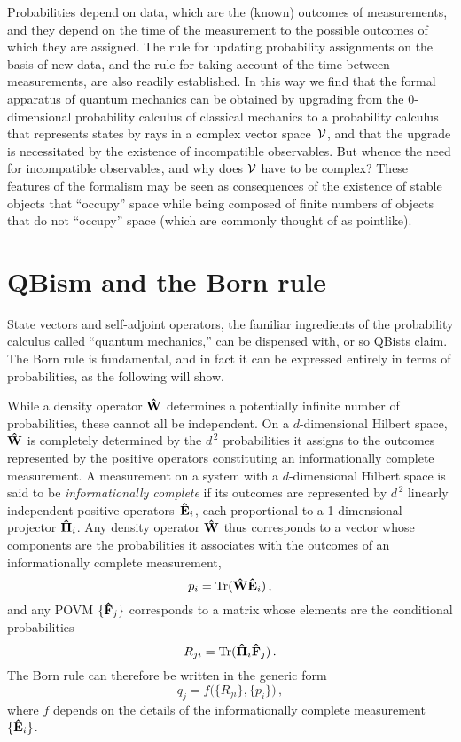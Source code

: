 \documentclass[smallextended]{svjour3}
\newcommand{\be}{\begin{equation}}
\newcommand{\ee}{\end{equation}}
\newcommand{\hE}{{\bf\hat E}}
\newcommand{\hF}{{\bf\hat F}}
\newcommand{\hW}{{\bf\hat W}}
\newcommand{\hPi}{{\bf\hat\Pi}}
\newcommand{\cV}{{\cal V}}
\begin{document}
Probabilities depend on data, which are the (known) outcomes of measurements, and they depend on the time of the measurement to the possible outcomes of which they are assigned. The rule for updating probability assignments on the basis of new data, and the rule for taking account of the time between measurements, are also readily established.\cite{Mohrhoff-QMexplained} In this way we find that the formal apparatus of quantum mechanics can be obtained by upgrading from the 0-dimensional probability calculus of classical mechanics to a probability calculus that represents states by rays in a complex vector space~$\cV$, and that the upgrade is necessitated by the existence of incompatible observables. But whence the need for incompatible observables, and why does $\cV$ have to be complex? These features of the formalism may be seen as consequences of the existence of stable objects that ``occupy'' space while being composed of finite numbers of objects that do not ``occupy'' space (which are commonly thought of as pointlike).\cite{Mohrhoff_Manifesting,Mohrhoff-QMexplained}


\section{QBism and the Born rule}\label{sec.QBBorn}
State vectors and self-adjoint operators, the familiar ingredients of the probability calculus called ``quantum mechanics,'' can be dispensed with, or so QBists claim. The Born rule is fundamental, and in fact it can be expressed entirely in terms of probabilities, as the following will show. 

While a density operator $\hW$ determines a potentially infinite number of probabilities, these cannot all be independent. On a $d$-dimensional Hilbert space, $\hW$ is completely determined by the $d^{\,2}$ probabilities it assigns to the outcomes represented by the positive operators constituting an informationally complete measurement. A measurement on a system with a $d$-dimensional Hilbert space is said to be \emph{informationally complete} if its outcomes are represented by $d^{\,2}$ linearly independent positive operators~$\hE_i$, each proportional to a 1-dimensional projector $\hPi_i$. Any density operator $\hW$ thus corresponds to a vector whose components are the probabilities it associates with the outcomes of an informationally complete measurement, 
\be
p_i=\hbox{Tr}(\hW\hE_i)\,,
\ee
and any POVM $\{\hF_j\}$ corresponds to a matrix whose elements are the conditional probabilities
\be
R_{ji}=\hbox{Tr}(\hPi_i\hF_j)\,.
\ee
The Born rule can therefore be written in the generic form
\be
q_j= f \bigl(\{R_{ji}\},\{p_i\}\bigr)\,,
\label{eq.genericBorn}
\ee
where $f$ depends on the details of the informationally complete measurement $\{\hE_i\}$.
\end{document}
